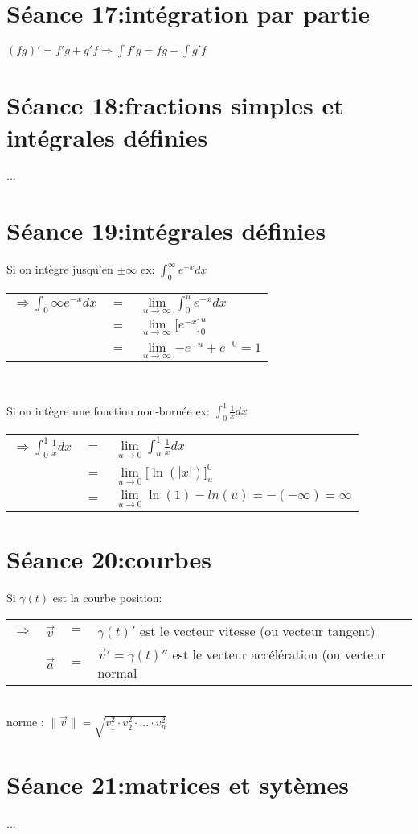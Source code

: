 \documentclass[12pt]{article}
\begin{document}
\section*{S\'eance 17:int\'egration par partie}
$(fg)' = f'g + g'f \Rightarrow \int{f'g} = fg - \int{g'f}$ 
\section*{S\'eance 18:fractions simples et int\'egrales d\'efinies}
...
\section*{S\'eance 19:int\'egrales d\'efinies}

Si on int\`egre jusqu'en $\pm \infty$ ex: $\int_{0}^{\infty}{e^{-x} dx}$ \\

\begin{tabular}{ r c l }
  \( \Rightarrow \int_{0}{\infty}{e^{-x} dx} \)& \(=\) & \(\underset{u\to \infty}\lim \int_{0}^{u}{e^{-x} dx}\) \\
   & \(=\) & \(\underset{u\to \infty}\lim \lbrack e^{-x}\rbrack_{0}^{u}\) \\
   & \(=\) & \(\underset{u\to \infty}\lim{-e^{-u} + e^{-0}} = 1\)
\end{tabular} \\ \newline

Si on int\`egre une fonction non-born\'ee ex: $\int_{0}^{1}{\frac{1}{x} dx}$ \\
\begin{tabular}{r c l }
	\( \Rightarrow \int_{0}^{1}{\frac{1}{x} dx}\) & \( = \) & \(\underset{u\to 0}\lim{\int_{u}^{1}{\frac{1}{x} dx}}\) \\
	& \( = \) & \(\underset{u\to 0}\lim{\lbrack \ln(|x|) \rbrack_{u}^{0}}\) \\
	& \( = \) & \(\underset{u\to 0}\lim{\ln(1) - ln(u)} = -(-\infty) = \infty\)
\end{tabular}

\section*{S\'eance 20:courbes}
Si $\gamma(t)$ est la courbe position: \\
\begin{tabular}{r c c l }
	\(\Rightarrow\) & \(\vec{v}\) & \( = \) & \(\gamma(t)'\) est le vecteur vitesse (ou vecteur tangent)\\
	& \(\vec{a}\) & \( = \) & \(\vec{v}' = \gamma(t)''\) est le vecteur acc\'el\'eration (ou vecteur normal
\end{tabular} \\ \newline
norme : \(\|\vec{v}\| = \sqrt{v_{1}^{2} \cdot v_{2}^{2} \cdot ... \cdot v_{n}^{2} }\)
\section*{S\'eance 21:matrices et syt\`emes}
...
\end{document}
